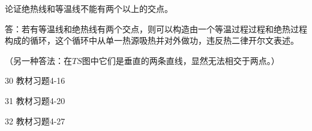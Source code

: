 \documentclass[CJK]{beamer}
\begin{document}
\begin{frame}
\bch
{\blue 论证绝热线和等温线不能有两个以上的交点。}


\skiplines

答：若有等温线和绝热线有两个交点，则可以构造由一个等温过程过程和绝热过程构成的循环，这个循环中从单一热源吸热并对外做功，违反热二律开尔文表述。

\skipline

（另一种答法：在$TS$图中它们是垂直的两条直线，显然无法相交于两点。）
\ech
\end{frame}


\begin{frame}
\bch

\bitem
\item[30]{教材习题4-16}
\item[31]{教材习题4-20}
\item[32]{教材习题4-27}
\eitem

\ech
\end{frame}
\end{document}
